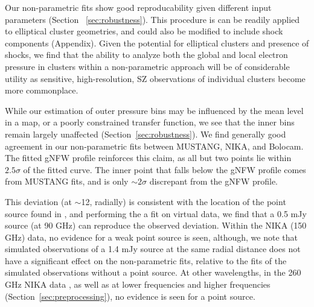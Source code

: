 \documentclass[twocolumn,traditabstract]{aa}
\begin{document}
Our non-parametric fits show good reproducability given different input parameters (Section ~\ref{sec:robustness}).
This procedure is can be readily applied to elliptical cluster geometries, and could also be modified
to include shock components (Appendix). Given the potential for elliptical clusters and presence of shocks,
we find that the ability to analyze both the global and local electron pressure in clusters within a
non-parametric approach will be of considerable utility as sensitive, high-resolution,
SZ observations of individual clusters become more commonplace.


While our estimation of outer pressure bins may be influenced by the mean level in a map, or a poorly constrained
transfer function, we see that the inner bins remain largely unaffected (Section~\ref{sec:robustness}).
We find generally good agreement in our non-parametric fits between MUSTANG, NIKA, and Bolocam.
The fitted gNFW profile reinforces this claim, as all but two points
lie within $2.5\sigma$ of the fitted curve. The inner point that falls below the gNFW profile comes from
MUSTANG fits, and is only $\sim 2\sigma$ discrepant from the gNFW profile.

This deviation (at $\sim$12\asec, radially) is consistent with the location of the point source found in
\citet{korngut2011}, and performing the a fit on virtual data, we find that a 0.5 mJy source (at 90 GHz)
can reproduce the observed deviation. Within the NIKA (150 GHz) data, no evidence for a weak point source is seen,
although, we note that simulated observations of a 1.4 mJy source at the same radial distance does not have a
significant effect on the non-parametric fits, relative to the fits of the simulated observations without a point source.
At other wavelengths, in the 260 GHz NIKA data \citep{adam2015}, as well as at lower frequencies and higher frequencies
(Section~\ref{sec:preprocessing}), no evidence is seen for a point source.


\end{document}
